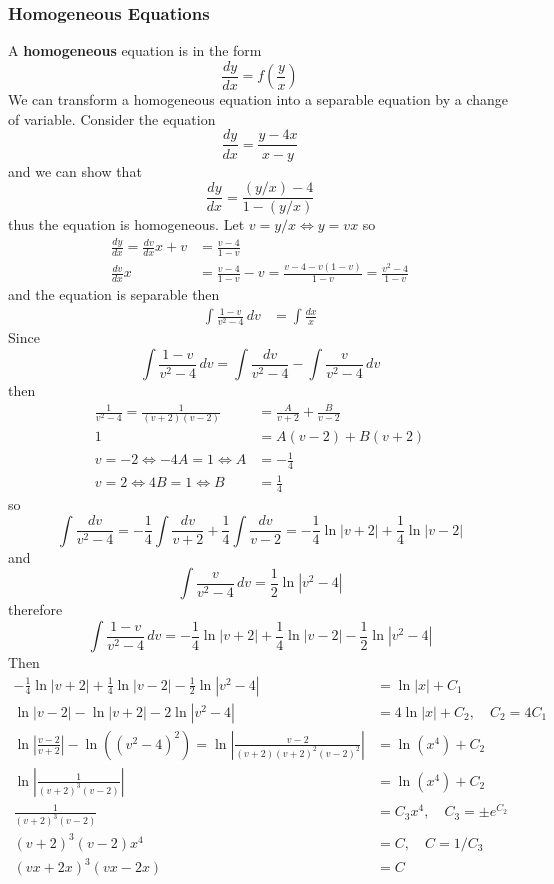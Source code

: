\subsubsection{Homogeneous Equations}
A \textbf{homogeneous} equation is in the form
\[\frac{dy}{dx}=f\left(\frac{y}{x}\right)\]
We can transform a homogeneous equation into a separable equation by a change
of variable.
Consider the equation
\[\frac{dy}{dx}=\frac{y-4x}{x-y}\]
and we can show that
\[\frac{dy}{dx}=\frac{(y/x)-4}{1-(y/x)}\]
thus the equation is homogeneous.
Let \(v=y/x\iff y=vx\) so
\begin{align*}
    \frac{dy}{dx}=\frac{dv}{dx}x+v &= \frac{v-4}{1-v} \\
    \frac{dv}{dx}x
    &= \frac{v-4}{1-v}-v=\frac{v-4-v(1-v)}{1-v}=\frac{v^2-4}{1-v}
\end{align*}
and the equation is separable then
\begin{align*}
    \int\frac{1-v}{v^2-4}\,dv &= \int\frac{dx}{x}
\end{align*}
Since
\[\int\frac{1-v}{v^2-4}\,dv=\int\frac{dv}{v^2-4}-\int\frac{v}{v^2-4}\,dv\]
then
\begin{align*}
    \frac{1}{v^2-4}=\frac{1}{(v+2)(v-2)} &= \frac{A}{v+2}+\frac{B}{v-2} \\
    1 &= A(v-2)+B(v+2) \\
    v=-2\iff -4A=1\iff A &= -\frac{1}{4} \\
    v=2\iff 4B=1\iff B &= \frac{1}{4}
\end{align*}
so
\[\int\frac{dv}{v^2-4}
=-\frac{1}{4}\int\frac{dv}{v+2}+\frac{1}{4}\int\frac{dv}{v-2}
=-\frac{1}{4}\ln|v+2|+\frac{1}{4}\ln|v-2|\]
and
\[\int\frac{v}{v^2-4}\,dv=\frac{1}{2}\ln|v^2-4|\]
therefore
\[\int\frac{1-v}{v^2-4}\,dv
=-\frac{1}{4}\ln|v+2|+\frac{1}{4}\ln|v-2|-\frac{1}{2}\ln|v^2-4|\]
Then
\begin{align*}
    -\frac{1}{4}\ln|v+2|+\frac{1}{4}\ln|v-2|-\frac{1}{2}\ln|v^2-4|
    &= \ln|x|+C_1 \\
    \ln|v-2|-\ln|v+2|-2\ln|v^2-4| &= 4\ln|x|+C_2,\quad C_2=4C_1 \\
    \ln\left|\frac{v-2}{v+2}\right|-\ln((v^2-4)^2)
    =\ln\left|\frac{v-2}{(v+2)(v+2)^2(v-2)^2}\right| &= \ln(x^4)+C_2 \\
    \ln\left|\frac{1}{(v+2)^3(v-2)}\right| &= \ln(x^4)+C_2 \\
    \frac{1}{(v+2)^3(v-2)} &= C_3x^4,\quad C_3=\pm e^{C_2} \\
    (v+2)^3(v-2)x^4 &= C,\quad C=1/C_3 \\
    (vx+2x)^3(vx-2x) &= C
\end{align*}
